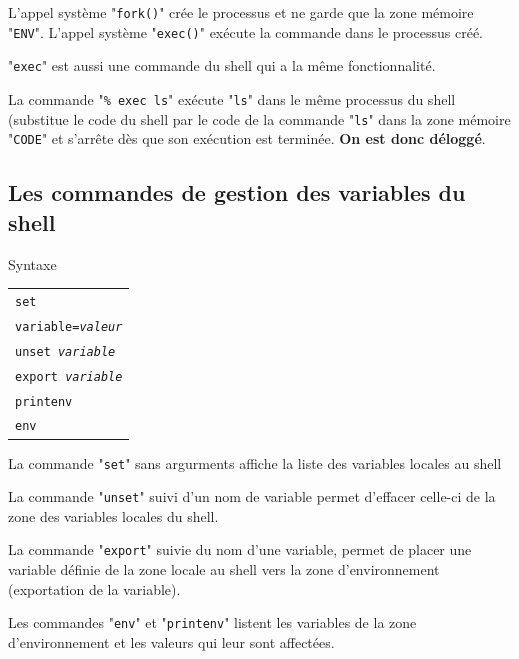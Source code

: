 L'appel syst{\`e}me "\texttt{fork()}" cr{\'e}e le processus et ne garde
que la zone m{\'e}moire "\texttt{ENV}". L'appel syst{\`e}me
"\texttt{exec()}" ex{\'e}cute la commande dans le processus cr{\'e}{\'e}.

\begin{remarque}
"\texttt{exec}" est aussi une commande du shell qui a la m{\^e}me fonctionnalit{\'e}.
\end{remarque}

La commande "\verb=% exec ls=" ex{\'e}cute "\texttt{ls}" dans le m{\^e}me processus
du shell (substitue le code du shell par le code de la commande "\texttt{ls}"
dans la zone m{\'e}moire "\texttt{CODE}" et s'arr{\^e}te d{\`e}s que son ex{\'e}cution est
termin{\'e}e. {\bf On est donc d{\'e}logg{\'e}}.

\subsection{Les commandes de gestion des variables du shell}

\begin{definition}{Syntaxe}
\begin{tabular}{@{\hspace{1cm}}l}
	\texttt{set}\\[0.2cm]
	\texttt{variable=\textsl{valeur}}\\[0.2cm]
	\texttt{unset \textsl{variable}}\\[0.2cm]
	\texttt{export \textsl{variable}}\\[0.2cm]
	\texttt{printenv}\\[0.2cm]
	\texttt{env}\\
\end{tabular}
\end{definition}

La commande "\texttt{set}" sans argurments
affiche la liste des variables locales au shell

La commande "\texttt{unset}" suivi d'un nom de variable permet
d'effacer celle-ci de la zone des variables locales du shell.

La commande "\texttt{export}" suivie du nom d'une variable, permet de
placer une variable d{\'e}finie de la zone locale au shell vers la zone
d'environnement (exportation de la variable).

Les commandes "\texttt{env}" et
"\texttt{printenv}" listent les variables de la
zone d'environnement et les valeurs qui leur sont affect{\'e}es.


